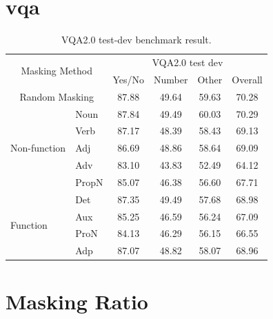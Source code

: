 \section{\Acrlong{vqa}}

\begin{table}[]
    \centering
    \label{tab:vqa}
    \caption{VQA2.0 test-dev benchmark result.}
    \begin{adjustbox}{width=0.6\textwidth}
        \begin{tabular}{ll|cccc}
            \hline
            \multicolumn{2}{c|}{\multirow{2}{*}{Masking Method}} & \multicolumn{4}{c}{VQA2.0 test dev} \\
            & & Yes/No & Number & Other & Overall \\
            \hline
            \multicolumn{2}{c|}{Random Masking} & 87.88 & 49.64 & 59.63 & 70.28 \\
            \hline
            \multirow{5}{*}{Non-function} & Noun & 87.84 & 49.49 & 60.03 & 70.29 \\
            & Verb & 87.17 & 48.39 & 58.43 & 69.13 \\
            & Adj & 86.69 & 48.86 & 58.64 & 69.09 \\
            & Adv & 83.10 & 43.83 & 52.49 & 64.12 \\
            & PropN & 85.07 & 46.38 & 56.60 & 67.71 \\
            \hline
            \multirow{4}{*}{Function} & Det & 87.35 & 49.49 & 57.68 & 68.98 \\
            & Aux & 85.25 & 46.59 & 56.24 & 67.09 \\
            & ProN & 84.13 & 46.29 & 56.15 & 66.55 \\
            & Adp & 87.07 & 48.82 & 58.07 & 68.96 \\
            \hline
        \end{tabular}
    \end{adjustbox}
\end{table}

\section{Masking Ratio}